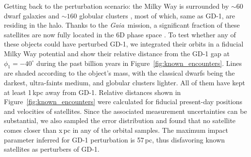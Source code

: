 \documentclass[twocolumn]{aastex62}
\newcommand{\gaia}{\textsl{Gaia}}
\begin{document}
Getting back to the perturbation scenario: the Milky Way is surrounded by $\sim60$ dwarf galaxies \citep{mcconnachie2012} and $\sim160$ globular clusters \citep{harris2010}, most of which, same as GD-1, are residing in the halo.
Thanks to the \gaia\ mission, a significant fraction of these satellites are now fully located in the 6D phase space \citep{simon2018, gdr2_satellites}.
To test whether any of these objects could have perturbed GD-1, we integrated their orbits in a fiducial Milky Way potential \citep{pw2017} and show their relative distance from the GD-1 gap at $\phi_1=-40^\circ$ during the past billion years in Figure~\ref{fig:known_encounters}.
Lines are shaded according to the object's mass, with the classical dwarfs being the darkest, ultra-faints medium, and globular clusters lighter.
All of them have kept at least 1\,kpc away from GD-1.
Relative distances shown in Figure~\ref{fig:known_encounters} were calculated for fiducial present-day positions and velocities of satellites.
Since the associated measurement uncertainties can be substantial, we also sampled the error distribution and found that no satellite comes closer than x\,pc in any of the orbital samples.
The maximum impact parameter inferred for GD-1 perturbation is 57\,pc, thus disfavoring known satellites as perturbers of GD-1.

\end{document}
